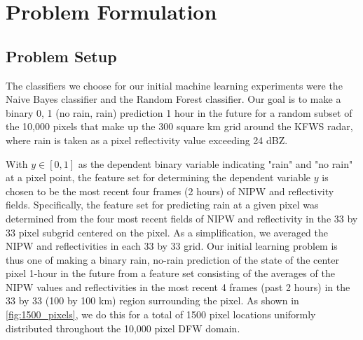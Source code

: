 \documentclass[proposal]{umassthesis}
\begin{document}
\chapter{Problem Formulation}

\section{Problem Setup}
The classifiers we choose for our initial machine learning experiments were the Naive Bayes classifier and the Random Forest classifier. Our goal is to make a binary 0, 1 (no rain, rain) prediction 1 hour in the future for a random subset of the 10,000 pixels that make up the 300 square km grid around the KFWS radar, where rain is taken as a pixel reflectivity value exceeding 24 dBZ.
 
With $y\in[0,1]$ as the dependent binary variable indicating "rain" and "no rain" at a pixel point, the feature set for determining the dependent variable $y$ is chosen to be the most recent four frames (2 hours) of NIPW and reflectivity fields. Specifically, the feature set for predicting rain at a given pixel was determined from the four most recent fields of NIPW and reflectivity in the 33 by 33 pixel subgrid centered on the pixel. As a simplification, we averaged the NIPW and reflectivities in each 33 by 33 grid. Our initial learning problem is thus one of making a binary rain, no-rain prediction of the state of the center pixel 1-hour in the future from a feature set consisting of the averages of the NIPW values and reflectivities in the most recent 4 frames (past 2 hours) in the 33 by 33 (100 by 100 km) region surrounding the pixel. As shown in \ref{fig:1500_pixels}, we do this for a total of 1500 pixel locations uniformly distributed throughout the 10,000 pixel DFW domain.
\end{document}

